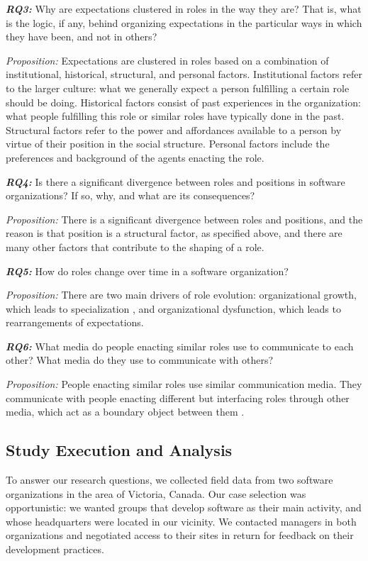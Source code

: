 \documentclass[10pt, conference, compsocconf]{IEEEtran}
\begin{document}
\textbf{\emph{RQ3:}} Why are expectations clustered in roles in the way they are? That is, what is the logic, if any, behind organizing expectations in the particular ways in which they have been, and not in others?

\emph{Proposition:} Expectations are clustered in roles based on a combination of institutional, historical, structural, and personal factors. Institutional factors refer to the larger culture: what we generally expect a person fulfilling a certain role should be doing. Historical factors consist of past experiences in the organization: what people fulfilling this role or similar roles have typically done in the past. Structural factors refer to the power and affordances available to a person by virtue of their position in the social structure. Personal factors include the preferences and background of the agents enacting the role.

\textbf{\emph{RQ4:}} Is there a significant divergence between roles and positions in software organizations? If so, why, and what are its consequences?

\emph{Proposition:} There is a significant divergence between roles and positions, and the reason is that position is a structural factor, as specified above, and there are many other factors that contribute to the shaping of a role.

\textbf{\emph{RQ5:}} How do roles change over time in a software organization?

\emph{Proposition:} There are two main drivers of role evolution: organizational growth, which leads to specialization \cite{Blau1971,Haveman1993}, and organizational dysfunction, which leads to rearrangements of expectations.

\textbf{\emph{RQ6:}} What media do people enacting similar roles use to communicate to each other? What media do they use to communicate with others?

\emph{Proposition:} People enacting similar roles use similar communication media. They communicate with people enacting different but interfacing roles through other media, which act as a boundary object between them \cite{Bowker1999}.



\subsection{Study Execution and Analysis}

To answer our research questions, we collected field data from two software organizations in the area of Victoria, Canada. Our case selection was opportunistic: we wanted groups that develop software as their main activity, and whose headquarters were located in our vicinity. We contacted managers in both organizations and negotiated access to their sites in return for feedback on their development practices.
\end{document}
